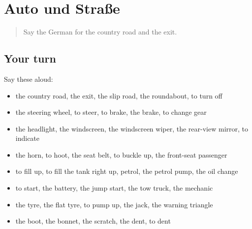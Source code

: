 \section[(dialogue)]{Auto und Straße}

\label{lesson:GE-R405-review-398-405}



\begin{quote}
Say the German for the country road and the exit.
\end{quote}

\subsection*{Your turn}
Say these aloud:

\begin{itemize}
\raggedright
  \item the country road, the exit, the slip road, the roundabout, to turn off
  \item the steering wheel, to steer, to brake, the brake, to change gear
  \item the headlight, the windscreen, the windscreen wiper, the rear-view mirror, to indicate
  \item the horn, to hoot, the seat belt, to buckle up, the front-seat passenger
  \item to fill up, to fill the tank right up, petrol, the petrol pump, the oil change
  \item to start, the battery, the jump start, the tow truck, the mechanic
  \item the tyre, the flat tyre, to pump up, the jack, the warning triangle
  \item the boot, the bonnet, the scratch, the dent, to dent
\end{itemize}

